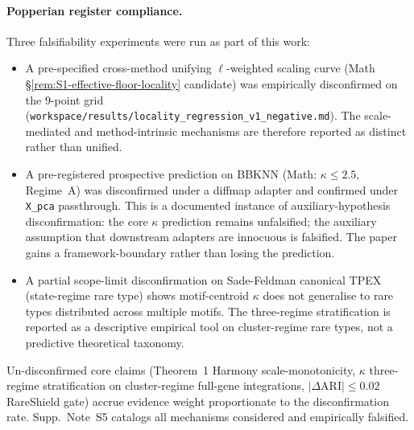 \paragraph{Popperian register compliance.} Three falsifiability experiments were run as part of this work:
\begin{itemize}\itemsep0pt
    \item A pre-specified cross-method unifying $\ell$-weighted scaling curve (Math §\ref{rem:S1-effective-floor-locality} candidate) was empirically disconfirmed on the 9-point grid (\texttt{workspace/results/locality\_regression\_v1\_negative.md}). The scale-mediated and method-intrinsic mechanisms are therefore reported as distinct rather than unified.
    \item A pre-registered prospective prediction on BBKNN (Math: $\kappa \le 2.5$, Regime~A) was disconfirmed under a diffmap adapter and confirmed under \texttt{X\_pca} passthrough. This is a documented instance of auxiliary-hypothesis disconfirmation: the core $\kappa$ prediction remains unfalsified; the auxiliary assumption that downstream adapters are innocuous is falsified. The paper gains a framework-boundary rather than losing the prediction.
    \item A partial scope-limit disconfirmation on Sade-Feldman canonical TPEX (state-regime rare type) shows motif-centroid $\kappa$ does not generalise to rare types distributed across multiple motifs. The three-regime stratification is reported as a descriptive empirical tool on cluster-regime rare types, not a predictive theoretical taxonomy.
\end{itemize}
Un-disconfirmed core claims (Theorem~1 Harmony scale-monotonicity, $\kappa$ three-regime stratification on cluster-regime full-gene integrations, $|\Delta\mathrm{ARI}|\le 0.02$ RareShield gate) accrue evidence weight proportionate to the disconfirmation rate. Supp.~Note~S5 catalogs all mechanisms considered and empirically falsified.

